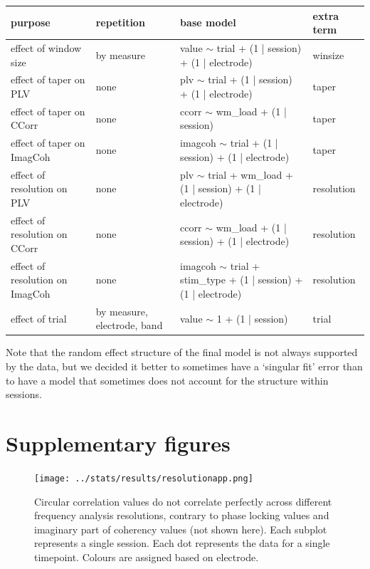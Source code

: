 \begin{tabularx}{\linewidth}{| X | X X X |}
\hline
purpose & repetition & base model & extra term\\\hline
effect of window size & by measure & value $\sim$ trial + (1 | session) + (1 | electrode) & winsize\\
effect of taper on PLV & none & plv $\sim$ trial + (1 | session) + (1 | electrode) & taper\\
effect of taper on CCorr & none & ccorr $\sim$ wm\_load + (1 | session) & taper\\
effect of taper on ImagCoh & none & imagcoh $\sim$ trial + (1 | session) + (1 | electrode) & taper\\
effect of resolution on PLV & none & plv $\sim$ trial + wm\_load + (1 | session) + (1 | electrode) & resolution\\
effect of resolution on CCorr & none & ccorr $\sim$ wm\_load + (1 | session) + (1 | electrode) & resolution\\
effect of resolution on ImagCoh & none & imagcoh $\sim$ trial + stim\_type + (1 | session) + (1 | electrode) & resolution\\
effect of trial & by measure, electrode, band & value $\sim$ 1 + (1 | session) & trial\\\hline
\end{tabularx}

Note that the random effect structure of the final model is not always supported
by the data, but we decided it better to sometimes have a `singular fit' error
than to have a model that sometimes does not account for the structure within
sessions.


\section{Supplementary figures}
\label{app:supplementaryfigures}

\begin{figure}[!htpb]
  \texttt{[image: ../stats/results/resolutionapp.png]}
  \caption{Circular correlation values do not correlate perfectly across different frequency analysis resolutions, contrary to phase locking values and imaginary part of coherency values (not shown here). Each subplot represents a single session. Each dot represents the data for a single timepoint. Colours are assigned based on electrode.}
  \label{fig:resolutionapp}
\end{figure}

